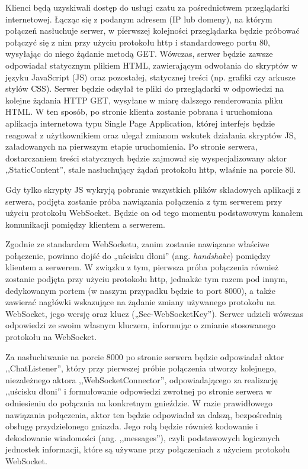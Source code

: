 \documentclass[11pt,oneside,a4paper,titlepage,onecolumn]{article}
\begin{document}
Klienci będą uzyskiwali dostęp do usługi czatu za pośrednictwem przeglądarki internetowej. Łącząc się z podanym adresem (IP lub domeny), 
na którym połączeń nasłuchuje serwer, w pierwszej kolejności przeglądarka będzie próbować połączyć się z nim przy użyciu protokołu http 
i standardowego portu 80, wysyłając do niego żądanie metodą GET. Wówczas, serwer będzie zawsze odpowiadał statycznym plikiem HTML, zawierającym 
odwołania do skryptów w języku JavaScript (JS) oraz pozostałej, statycznej treści (np. grafiki czy arkusze stylów CSS). Serwer będzie 
odsyłał te pliki do przeglądarki w odpowiedzi na kolejne żądania HTTP GET, wysyłane w miarę dalszego renderowania pliku HTML. W ten sposób, 
po stronie klienta zostanie pobrana i uruchomiona aplikacja internetowa typu Single Page Application, której interfejs będzie reagował z 
użytkownikiem oraz ulegał zmianom wskutek działania skryptów JS, załadowanych na pierwszym etapie uruchomienia. Po stronie serwera, 
dostarczaniem treści statycznych będzie zajmował się wyspecjalizowany aktor „StaticContent”, stale nasłuchujący żądań protokołu http, 
właśnie na porcie 80.

Gdy tylko skrypty JS wykryją pobranie wszystkich plików składowych aplikacji z serwera, podjęta zostanie próba nawiązania połączenia 
z tym serwerem przy użyciu protokołu WebSocket. Będzie on od tego momentu podstawowym kanałem komunikacji pomiędzy klientem a serwerem. 

Zgodnie ze standardem WebSocketu, zanim zostanie nawiązane właściwe połączenie, powinno dojść do „uścisku dłoni” (ang. \textit{handshake}) pomiędzy 
klientem a serwerem. W związku z tym, pierwsza próba połączenia również zostanie podjęta przy użyciu protokołu http, jednakże tym razem pod
innym, dedykowanym portem (w naszym przypadku będzie to port 8000), a także zawierać nagłówki wskazujące na żądanie zmiany używanego protokołu 
na WebSocket, jego wersję oraz klucz („Sec-WebSocketKey”). Serwer udzieli wówczas odpowiedzi ze swoim własnym kluczem, informując o zmianie 
stosowanego protokołu na WebSocket.

Za nasłuchiwanie na porcie 8000 po stronie serwera będzie odpowiadał aktor ,,ChatListener'', który przy pierwszej próbie połączenia 
utworzy kolejnego, niezależnego aktora ,,WebSocketConnector'', odpowiadającego za realizację ,,uścisku dłoni'' i formułowanie odpowiedzi zwrotnej 
po stronie serwera w odniesieniu do połącznia na konkretnym gnieździe. W razie prawidłowego nawiązania połączenia, aktor ten będzie odpowiadał 
za dalszą, bezpośrednią obsługę przydzielonego gniazda. Jego rolą będzie również kodowanie i dekodowanie wiadomości (ang.
,,messages''), czyli podstawowych logicznych jednostek informacji, które są używane przy połączeniach z użyciem protokołu WebSocket.
\end{document}
